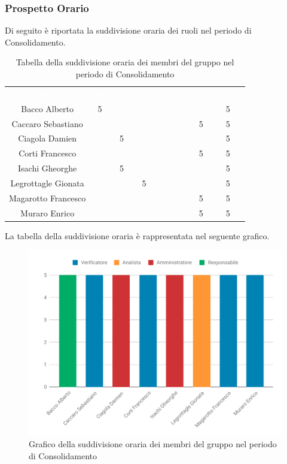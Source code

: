 \subsubsection{Prospetto Orario}
Di seguito è riportata la suddivisione oraria dei ruoli nel periodo di Consolidamento.




\begin{table}[H]	
	\begin{center}
	    \begin{tabular}{cccccccc}
	  		
			\rowcolor{greySWEight}
			\textcolor{white}{\textbf{Nome}} & \textcolor{white}{\textbf{Re}} & \textcolor{white}{\textbf{Am}} & \textcolor{white}{\textbf{An}} & \textcolor{white}{\textbf{Pj}} & \textcolor{white}{\textbf{Pr}} & \textcolor{white}{\textbf{Ve}} & \textcolor{white}{\textbf{Totale}}
			\\
			Bacco Alberto & 5 & & & & & & 5 \\
			Caccaro Sebastiano & & & & & & 5 & 5 \\
			Ciagola Damien & & 5 & & & & & 5 \\
			Corti Francesco & & & & & & 5 & 5 \\
			Isachi Gheorghe & & 5 & & & & & 5 \\
			Legrottagle Gionata & & & 5 & & & & 5 \\
			Magarotto Francesco & & & & & & 5 & 5 \\
			Muraro Enrico & & & & & & 5 & 5 \\

			\end{tabular}
	    \caption{Tabella della suddivisione oraria dei membri del gruppo nel periodo di Consolidamento} \label{tab:tabellaPersoneConsolidamento} 
	\end{center}
\end{table}

La tabella della suddivisione oraria è rappresentata nel seguente grafico.
\begin{figure}[H]
	\includegraphics[width=1\linewidth]{Preventivo/grafici/CO1.pdf}
	\caption{Grafico della suddivisione oraria dei membri del gruppo nel periodo di Consolidamento}
\end{figure}

